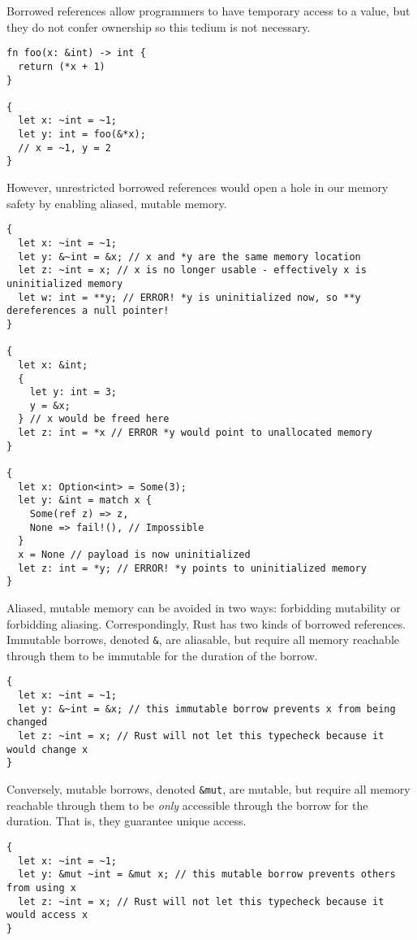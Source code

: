 Borrowed references allow programmers to have temporary access to a value,
but they do not confer ownership so this tedium is not necessary.
\begin{verbatim}
fn foo(x: &int) -> int {
  return (*x + 1)
}

{
  let x: ~int = ~1;
  let y: int = foo(&*x);
  // x = ~1, y = 2
}
\end{verbatim}

However, unrestricted borrowed references would open a hole in our memory safety
by enabling aliased, mutable memory.
\begin{verbatim}
{
  let x: ~int = ~1;
  let y: &~int = &x; // x and *y are the same memory location
  let z: ~int = x; // x is no longer usable - effectively x is uninitialized memory
  let w: int = **y; // ERROR! *y is uninitialized now, so **y dereferences a null pointer!
}

{
  let x: &int;
  {
    let y: int = 3;
    y = &x;
  } // x would be freed here
  let z: int = *x // ERROR *y would point to unallocated memory
}

{
  let x: Option<int> = Some(3);
  let y: &int = match x {
    Some(ref z) => z,
    None => fail!(), // Impossible
  }
  x = None // payload is now uninitialized
  let z: int = *y; // ERROR! *y points to uninitialized memory
}
\end{verbatim}

Aliased, mutable memory can be avoided in two ways: forbidding mutability or forbidding aliasing.
Correspondingly, Rust has two kinds of borrowed references.
Immutable borrows, denoted \texttt{\&}, are aliasable,
but require all memory reachable through them to be immutable for the duration of the borrow.
\begin{verbatim}
{
  let x: ~int = ~1;
  let y: &~int = &x; // this immutable borrow prevents x from being changed
  let z: ~int = x; // Rust will not let this typecheck because it would change x 
}
\end{verbatim}

Conversely, mutable borrows, denoted \texttt{\&mut}, are mutable,
but require all memory reachable through them to be \emph{only} accessible through the borrow
for the duration. That is, they guarantee unique access.
\begin{verbatim}
{
  let x: ~int = ~1;
  let y: &mut ~int = &mut x; // this mutable borrow prevents others from using x
  let z: ~int = x; // Rust will not let this typecheck because it would access x
}
\end{verbatim}

